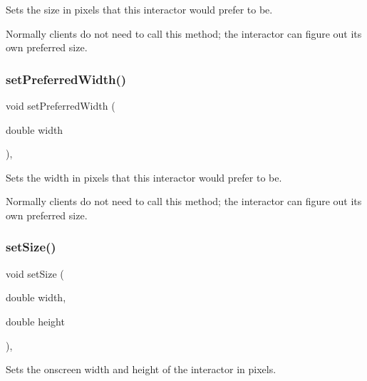Sets the size in pixels that this interactor would prefer to be. 

Normally clients do not need to call this method; the interactor can figure out its own preferred size. \mbox{\label{classsgl_1_1GInteractor_a3db429ab2fa52efd187eec0ed8cdd9f2}} 
\subsubsection{\texorpdfstring{set\+Preferred\+Width()}{setPreferredWidth()}}
{\footnotesize\ttfamily void set\+Preferred\+Width (\begin{DoxyParamCaption}\item[{double}]{width }\end{DoxyParamCaption})\hspace{0.3cm}{\ttfamily [virtual]}, {\ttfamily [inherited]}}



Sets the width in pixels that this interactor would prefer to be. 

Normally clients do not need to call this method; the interactor can figure out its own preferred size. \mbox{\label{classsgl_1_1GInteractor_aca25d49481f9bf5fc8f7df4c086c4ce7}} 
\subsubsection{\texorpdfstring{set\+Size()}{setSize()}\hspace{0.1cm}{\footnotesize\ttfamily [1/2]}}
{\footnotesize\ttfamily void set\+Size (\begin{DoxyParamCaption}\item[{double}]{width,  }\item[{double}]{height }\end{DoxyParamCaption})\hspace{0.3cm}{\ttfamily [virtual]}, {\ttfamily [inherited]}}



Sets the onscreen width and height of the interactor in pixels. 


